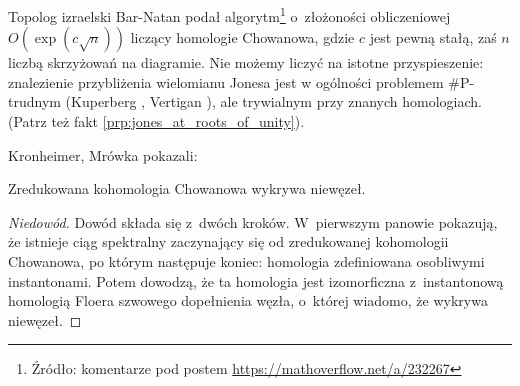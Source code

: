 Topolog izraelski Bar-Natan \cite{barnatan2007} podał algorytm\footnote{Źródło: komentarze pod postem \url{https://mathoverflow.net/a/232267}} o~złożoności obliczeniowej $O(\exp(c \sqrt n))$ liczący homologie Chowanowa, gdzie $c$ jest pewną stałą, zaś $n$ liczbą skrzyżowań na diagramie.
%
Nie możemy liczyć na istotne przyspieszenie:
znalezienie przybliżenia wielomianu Jonesa jest w ogólności problemem \#P-trudnym (Kuperberg \cite{kuperberg2015}, Vertigan \cite{vertigan2005}),
%
%
ale trywialnym przy znanych homologiach.
(Patrz też fakt \ref{prp:jones_at_roots_of_unity}).

Kronheimer, Mrówka \cite{kronheimer2011} pokazali:
%
%

\begin{proposition}
\label{khovanov_detects_unknot}%
    Zredukowana kohomologia Chowanowa wykrywa niewęzeł.
\end{proposition}

\begin{proof}[Niedowód]
%
    Dowód składa się z~dwóch kroków.
    W~pierwszym panowie pokazują, że istnieje ciąg spektralny zaczynający się od zredukowanej kohomologii Chowanowa, po którym następuje koniec: homologia zdefiniowana osobliwymi instantonami.
    Potem dowodzą, że ta homologia jest izomorficzna z~instantonową homologią Floera szwowego dopełnienia węzła, o~której wiadomo, że wykrywa niewęzeł.
%
\end{proof}




